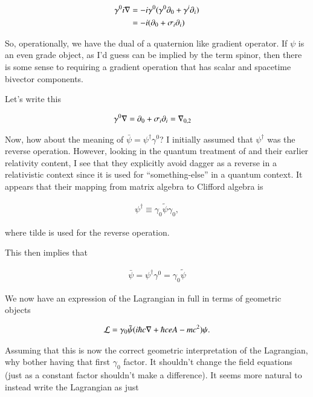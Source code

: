 \begin{align*}
\gamma^0 i \nabla
&= - i \gamma^0 (\gamma^0 \partial_0 + \gamma^i \partial_i) \\
&= - i (\partial_0 + \sigma_i \partial_i) \\
\end{align*}

So, operationally, we have the dual of a quaternion like gradient operator.  If $\psi$ is an even grade object, as I'd guess can be implied by
the term spinor, then there is some sense to requiring a gradient operation that has scalar and spacetime bivector components.

Let's write this

\begin{align*}
\gamma^0 \nabla &= \partial_0 + \sigma_i \partial_i = {\nabla}_{0,2}
\end{align*}

Now, how about the meaning of $\bar\psi = \psi^\dagger \gamma^0$?  I initially assumed that $\psi^\dagger$ was the reverse operation.
However, looking in the quantum treatment of \cite{doran2003gap} and their earlier relativity content, I see that they explicitly avoid dagger as a reverse in a relativistic context since it is used for ``something-else'' in a quantum context.  It appears that their mapping from matrix algebra to Clifford 
algebra is 

\begin{align*}
\psi^\dagger \equiv \gamma_0 \tilde{\psi} \gamma_0,
\end{align*}

where tilde is used for the reverse operation.

This then implies that 

\begin{align*}
\bar \psi = \psi^\dagger \gamma^0 = \gamma_0 \tilde{\psi}
\end{align*}

We now have an expression of the Lagrangian in full in terms of geometric objects

\begin{align}\label{eqn:diracLag:lag2}
\mathcal{L} = \gamma_0 \tilde{\psi} ( i \hbar c \nabla + \hbar c e A - mc^2) \psi.
\end{align}

Assuming that this is now the correct geometric interpretation of the Lagrangian, why bother having that first $\gamma_0$ factor.  It shouldn't change the field equations (just as a constant factor shouldn't make a difference).  It seems more natural to instead write the Lagrangian as just

